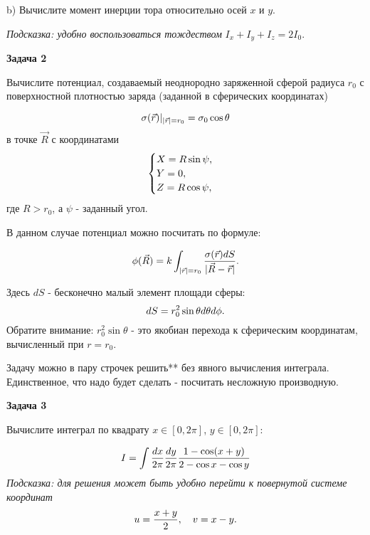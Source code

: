 \documentclass[a4paper,12pt]{article}
\begin{document}
\noindent b) Вычислите момент инерции тора относительно осей $x$ и $y$.

\noindent \textit{Подсказка: удобно воспользоваться тождеством} $I_{x}+I_{y}+I_{z}=2I_{0}$.

\vspace{15pt}
\noindent \textbf{Задача 2}

\noindent Вычислите потенциал, создаваемый неоднородно заряженной сферой радиуса $r_{0}$ с поверхностной плотностью заряда (заданной в сферических координатах)

\begin{equation}\notag
\sigma(\vec{r})|_{|\vec{r}|=r_{0}}	=\sigma_{0}\cos\theta
\end{equation}
\noindent в точке $\vec{R}$ с координатами
\begin{equation}
\begin{cases}
X=R\sin\psi,\\
Y=0,\\
Z=R\cos\psi,
\end{cases}\notag
\end{equation}
\noindent где $R>r_{0}$, а $\psi$ - заданный угол. 

\noindent В данном случае потенциал можно посчитать по формуле:

\begin{equation}\notag
\phi(\vec{R})	=k\int_{|\vec{r}|=r_{0}}\frac{\sigma(\vec{r})dS}{|\vec{R}-\vec{r}|}\text{.}
\end{equation}

\noindent Здесь $dS$ - бесконечно малый элемент площади сферы: 
\begin{equation}
\notag
dS	=r_{0}^{2}\sin\theta d\theta d\phi\text{.}
\end{equation}
\noindent Обратите внимание: $r_{0}^{2}\sin\theta$ - это якобиан перехода к сферическим координатам, вычисленный при $r=r_{0}$.

\noindent Задачу можно в пару строчек решить** без явного вычисления интеграла. Единственное, что надо будет сделать - посчитать несложную производную.

\vspace{15pt}
\noindent \textbf{Задача 3}

\noindent Вычислите интеграл по квадрату $x\in[0,2\pi]$, $y\in[0,2\pi]$:

\begin{equation}\notag
I	=\int\frac{dx}{2\pi}\frac{dy}{2\pi}\frac{1-\cos(x+y)}{2-\cos x-\cos y}
\end{equation}
\noindent \textit{Подсказка: для решения может быть удобно перейти к повернутой системе координат}
\begin{equation}\notag
u	=\frac{x+y}{2},\quad v=x-y.
\end{equation}
\end{document}
